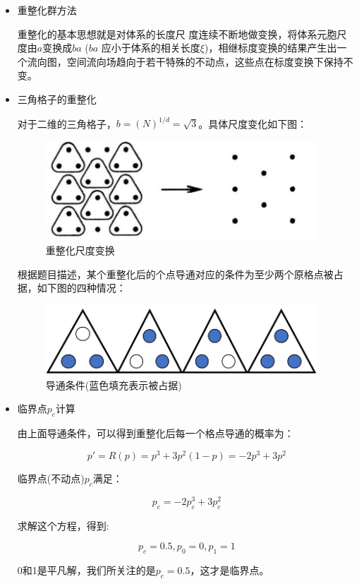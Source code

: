\documentclass[UTF8]{ctexart}
\begin{document}
	\begin{itemize}
		\item 重整化群方法
		
		重整化的基本思想就是对体系的长度尺
		度连续不断地做变换，将体系元胞尺度由$a$变换成$ ba $ ($ ba $ 应小于体系的相关长度$\xi$)，相继标度变换的结果产生出一个流向图，空间流向场趋向于若干特殊的不动点，这些点在标度变换下保持不变。
		
		\item 三角格子的重整化
		
		对于二维的三角格子，$b=(N)^{1/d}=\sqrt{3}$。具体尺度变化如下图：
		
				\begin{figure}[H]
						\centering  %
						\includegraphics[width=4in]{../result/1.png}
						\caption{重整化尺度变换}
					\end{figure}
		根据题目描述，某个重整化后的个点导通对应的条件为至少两个原格点被占据，如下图的四种情况：
		
			\begin{figure}[H]
			\centering  %
			\includegraphics[width=4in]{../result/2.png}
			\caption{导通条件(蓝色填充表示被占据)}
		\end{figure}
	
	\item 临界点$p_c$计算
	
	由上面导通条件，可以得到重整化后每一个格点导通的概率为：
	
	$$p'=R(p)=p^3+3p^2(1-p)=-2p^3+3p^2$$
	
	临界点(不动点)$p_c$满足：
	
	$$p_c=-2p_c^3+3p_c^2$$
	
	求解这个方程，得到:
	
	$$p_c=0.5,p_0=0,p_1=1$$
	
	0和1是平凡解，我们所关注的是$p_c=0.5$，这才是临界点。
	

\end{itemize}
\end{document}
